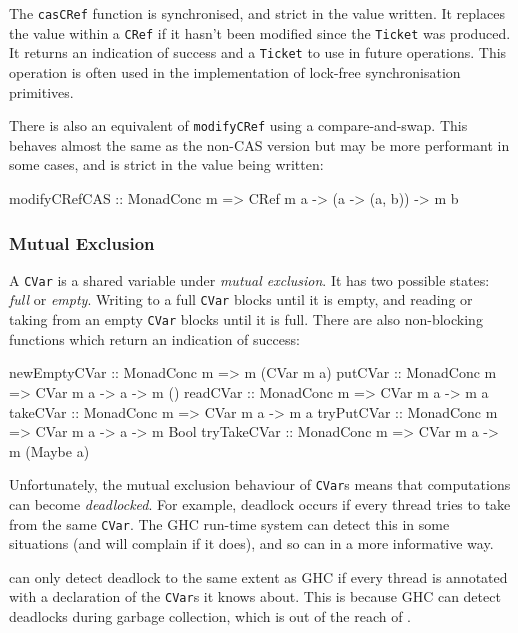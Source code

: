 The \verb|casCRef| function is synchronised, and strict in the value
written. It replaces the value within a \verb|CRef| if it hasn't been
modified since the \verb|Ticket| was produced. It returns an
indication of success and a \verb|Ticket| to use in future
operations. This operation is often used in the implementation of
lock-free synchronisation primitives.

There is also an equivalent of \verb|modifyCRef| using a
compare-and-swap. This behaves almost the same as the non-CAS version
but may be more performant in some cases, and is strict in the value
being written:

\begin{haskellcode}
modifyCRefCAS :: MonadConc m => CRef m a -> (a -> (a, b)) -> m b
\end{haskellcode}

\subsubsection{Mutual Exclusion}
\label{sec:abstraction-typeclass-cvars}

A \verb|CVar| is a shared variable under \emph{mutual exclusion}. It
has two possible states: \emph{full} or \emph{empty}. Writing to a
full \verb|CVar| blocks until it is empty, and reading or taking from
an empty \verb|CVar| blocks until it is full. There are also
non-blocking functions which return an indication of success:

\begin{haskellcode}
newEmptyCVar :: MonadConc m => m (CVar m a)
putCVar      :: MonadConc m => CVar m a -> a -> m ()
readCVar     :: MonadConc m => CVar m a -> m a
takeCVar     :: MonadConc m => CVar m a -> m a
tryPutCVar   :: MonadConc m => CVar m a -> a -> m Bool
tryTakeCVar  :: MonadConc m => CVar m a -> m (Maybe a)
\end{haskellcode}

Unfortunately, the mutual exclusion behaviour of \verb|CVar|s means
that computations can become \emph{deadlocked}. For example, deadlock
occurs if every thread tries to take from the same \verb|CVar|. The
GHC run-time system can detect this in some situations (and will
complain if it does), and so can \dejafu{} in a more informative way.

\begin{departure}
  \dejafu{} can only detect deadlock to the same extent as GHC if
  every thread is annotated with a declaration of the \verb|CVar|s it
  knows about. This is because GHC can detect deadlocks during garbage
  collection, which is out of the reach of \dejafu{}.
\end{departure}

